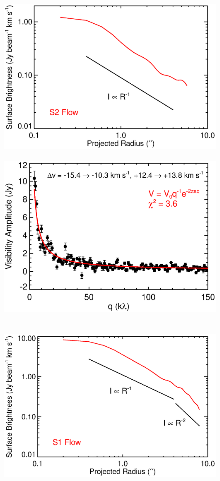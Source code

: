 \documentclass[iop]{emulateapj}
\begin{document}
\begin{figure}[hbt!]
\mbox{
          \includegraphics[scale=0.50]{f14.eps}
          \includegraphics[scale=0.50]{f15.eps}
          }
\\
\mbox{
          \includegraphics[scale=0.50]{f16.eps}
}
\end{figure}
\end{document}
